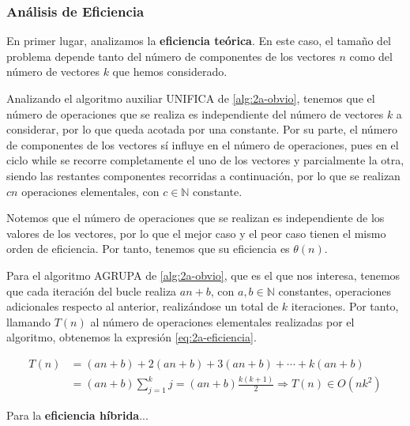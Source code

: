 

\subsubsection{Análisis de Eficiencia}

En primer lugar, analizamos la \textbf{eficiencia teórica}. En este caso,
el tamaño del problema depende tanto del número de componentes
de los vectores $n$ como del número de vectores $k$ que hemos
considerado. 

Analizando el algoritmo auxiliar UNIFICA de \ref{alg:2a-obvio}, tenemos que el 
número de operaciones que se realiza es independiente
del número de vectores $k$ a considerar, por lo que queda
acotada por una constante. Por su parte, el número de componentes de los
vectores sí influye en el número de operaciones, pues en el ciclo while se recorre completamente
el uno de los vectores y parcialmente la otra, siendo las restantes componentes recorridas
a continuación, por lo que se realizan $cn$ operaciones elementales,
con $c \in \mathbb N$ constante. 

Notemos que el número de operaciones que
se realizan es independiente de los valores de los vectores,
por lo que el mejor caso y el peor caso tienen el mismo orden
de eficiencia. Por tanto, tenemos que su eficiencia es $\theta(n)$. 

Para el algoritmo AGRUPA de \ref{alg:2a-obvio}, que es el que nos interesa,
tenemos que cada iteración del bucle realiza $an + b$, con $a,b \in \mathbb N$ constantes,
operaciones adicionales respecto al anterior,
realizándose un total de $k$ iteraciones. Por tanto, llamando $T(n)$ al número de
operaciones elementales realizadas por el algoritmo, obtenemos la 
expresión \ref{eq:2a-eficiencia}. 

\begin{equation} \label{eq:2a-eficiencia}
    \begin{split}
        T(n) & = (an + b) + 2(an + b) + 3(an + b) + \cdots + k(an + b) \\
             & = (an + b)\sum_{j=1}^k j = (an + b) \frac{k(k+1)}{2} \Rightarrow \boxed{T(n) \in O(nk^2)}
    \end{split}
\end{equation}

Para la \textbf{eficiencia híbrida}...